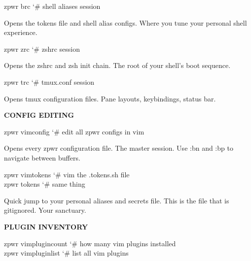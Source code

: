 \documentclass[11pt,a4paper,twoside]{book}
\begin{document}
\begin{codebox}
\color{neongreen}zpwr brc          {\char`\#} shell aliases session\\
\end{codebox}

Opens the tokens file and shell alias configs. Where you tune your personal shell experience.

\begin{codebox}
\color{neongreen}zpwr zrc          {\char`\#} zshrc session\\
\end{codebox}

Opens the zshrc and zsh init chain. The root of your shell's boot sequence.

\begin{codebox}
\color{neongreen}zpwr trc          {\char`\#} tmux.conf session\\
\end{codebox}

Opens tmux configuration files. Pane layouts, keybindings, status bar.


\vspace{12pt}
{\bfseries\color{neonyellow} CONFIG EDITING}\vspace{4pt}

\begin{codebox}
\color{neongreen}zpwr vimconfig    {\char`\#} edit all zpwr configs in vim\\
\end{codebox}

Opens every zpwr configuration file. The master session. Use :bn and :bp to navigate between buffers.

\begin{codebox}
\color{neongreen}zpwr vimtokens   {\char`\#} vim the .tokens.sh file\\
\color{neongreen}zpwr tokens      {\char`\#} same thing\\
\end{codebox}

Quick jump to your personal aliases and secrets file. This is the file that is gitignored. Your sanctuary.


\vspace{12pt}
{\bfseries\color{neonyellow} PLUGIN INVENTORY}\vspace{4pt}

\begin{codebox}
\color{neongreen}zpwr vimplugincount  {\char`\#} how many vim plugins installed\\
\color{neongreen}zpwr vimpluginlist   {\char`\#} list all vim plugins\\
\end{codebox}
\end{document}
